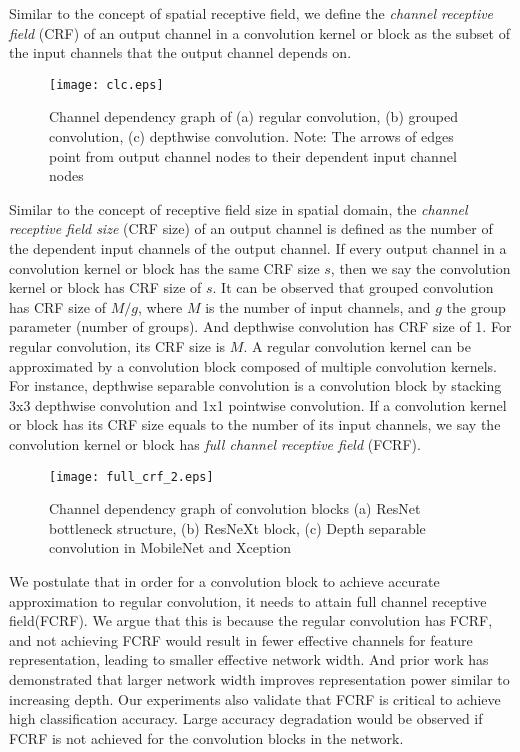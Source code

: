 \documentclass[10pt,twocolumn,letterpaper]{article}
\begin{document}
Similar to the concept of spatial receptive field, we define the \textit{channel receptive field } (CRF) of an output channel in a convolution kernel or block as the subset of the input channels that the output channel depends on. 
\begin{figure}[t!]
\begin{center}
\texttt{[image: clc.eps]}
\end{center}
\caption{Channel dependency graph of (a) regular convolution, (b) grouped convolution, (c) depthwise convolution. Note: The arrows of edges point from output channel nodes to their dependent input channel nodes}
\label{fig:clc}
\end{figure}
Similar to the concept of receptive field size in spatial domain, the \textit{channel receptive field size} (CRF size) of an output channel is defined as the number of the dependent input channels of the output channel. If every output channel in a convolution kernel or block has the same CRF size $s$, then we say the convolution kernel or block has CRF size of $s$. It can be observed that grouped convolution has CRF size of $M/g$, where $M$ is the number of input channels, and $g$ the group parameter (number of groups). And depthwise convolution has CRF size of 1. For regular convolution, its CRF size is $M$. A regular convolution kernel can be approximated by a convolution block composed of multiple convolution kernels. For instance, depthwise separable convolution is a convolution block by stacking 3x3 depthwise convolution and 1x1 pointwise convolution. If a convolution kernel or block has its CRF size equals to the number of its input channels, we say the convolution kernel or block has \textit{full channel receptive field} (FCRF). 

\begin{figure}[b!]
\begin{center}
\texttt{[image: full\_crf\_2.eps]}
\end{center}
   \caption{Channel dependency graph of convolution blocks (a) ResNet bottleneck structure\cite{resnet2016he}, (b) ResNeXt block\cite{resnext2016saining}, (c) Depth separable convolution in MobileNet\cite{mobilenet2017howard} and Xception\cite{xception2017chollet} }
\label{fig:fcrf}
\end{figure}

We postulate that in order for a convolution block to achieve accurate approximation to regular convolution, it needs to attain full channel receptive field(FCRF). We argue that this is because the regular convolution has FCRF, and not achieving FCRF would result in fewer effective channels for  feature representation, leading to smaller effective network width. And prior work\cite{wideresnet2016Zagoruyko} has demonstrated that larger network width improves representation power similar to increasing depth. Our experiments also validate that FCRF is critical to achieve high classification accuracy. Large accuracy degradation would be observed if FCRF is not achieved for the convolution blocks in the network.
\end{document}
